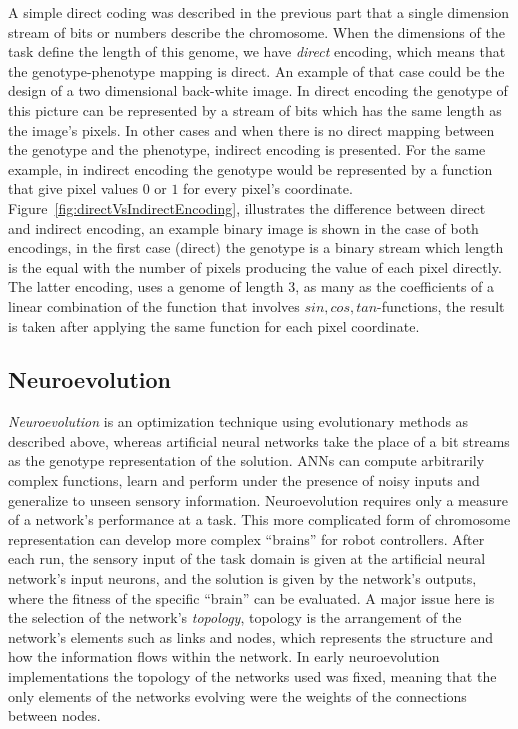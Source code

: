 A simple direct coding was described in the previous part that a single dimension stream of bits or numbers describe the chromosome. When the dimensions of the task define the length of this genome, we have \emph{direct} encoding, which means that the genotype-phenotype mapping is direct. An example of that case could be the design of a two dimensional back-white image. In direct encoding the genotype of this picture can be represented by a stream of bits which has the same length as the image's pixels. In other cases and when there is no direct mapping between the genotype and the phenotype, indirect encoding is presented. For the same example, in indirect encoding the genotype would be represented by a function that give pixel values $0$ or $1$ for every pixel's coordinate. Figure~\ref{fig:directVsIndirectEncoding}, illustrates the difference between direct and indirect encoding, an example binary image is shown in the case of both encodings, in the first case (direct) the genotype is a binary stream which length is the equal with the number of pixels producing the value of each pixel directly. The latter encoding, uses a genome of length 3, as many as the coefficients of a linear combination of the function that involves $sin, cos, tan$-functions, the result is taken after applying the same function for each pixel coordinate.


\subsection{Neuroevolution}
\emph{Neuroevolution} is an optimization technique using evolutionary methods as described above, whereas artificial neural networks take the place of a bit streams as the genotype representation of the solution. ANNs can compute arbitrarily complex functions, learn and perform under the presence of noisy inputs and generalize to unseen sensory information. Neuroevolution requires only a measure of a network's performance at a task. This more complicated form of chromosome representation can develop more complex ``brains'' for robot controllers. After each run, the sensory input of the task domain is given at the artificial neural network's input neurons, and the solution is given by the network's outputs, where the fitness of the specific ``brain'' can be evaluated. A major issue here is the selection of the network's \emph{topology}, topology is the arrangement of the network's elements such as links and nodes, which represents the structure and how the information flows within the network. In early neuroevolution implementations the topology of the networks used was fixed, meaning that the only elements of the networks evolving were the weights of the connections between nodes.





